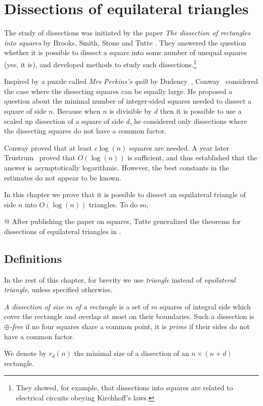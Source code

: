 \chapter{Dissections of equilateral triangles}

The study of dissections was initiated by the paper \emph{The dissection of rectangles into squares} by Brooks, Smith, Stone and Tutte \cite{BrooksSmithStoneTutte40}. They answered the question whether it is possible to dissect a square into some number of unequal squares (yes, it is), and developed methods to study such dissections.\footnote{They showed, for example, that dissections into squares are related to electrical circuits obeying Kirchhoff's laws.}

Inspired by a puzzle called \emph{Mrs Perkins's quilt} by Dudeney~\cite{Dudeney17}, Conway~\cite{Conway64} considered the case where the dissecting squares can be equally large. He proposed a question about the minimal number of integer-sided squares needed to dissect a square of side $n$. Because when $n$ is divisible by $d$ then it is possible to use a scaled up dissection of a square of side $d$, he considered only dissections where the dissecting squares do not have a common factor.

Conway proved that at least $c \log(n)$ squares are needed. A year later Trustrum~\cite{Trustrum65} proved that $O(\log(n))$ is sufficient, and thus established that the answer is asymptotically logarithmic. However, the best constants in the estimates do not appear to be known.

\bigskip

In this chapter we prove that it is possible to dissect an equilateral triangle of side $n$ into $O(\log(n))$ triangles. To do so, 

@ After publishing the paper \cite{BrooksSmithStoneTutte40} on squares, Tutte generalized the theorems for dissections of equilateral triangles in \cite{Tutte48}. 


\section{Definitions}

In the rest of this chapter, for brevity we use \emph{triangle} instead of \emph{equilateral triangle}, unless specified otherwise.

\begin{defn}
\emph{A dissection of size $m$ of a rectangle} is a set of $m$ squares of integral side which cover the rectangle and overlap at most on their boundaries. Such a dissection is \emph{$\oplus$-free} if no four squares share a common point, it is \emph{prime} if their sides do not have a common factor.

We denote by $r_d(n)$ the minimal size of a dissection of an $n \times (n+d)$ rectangle.
\end{defn}

